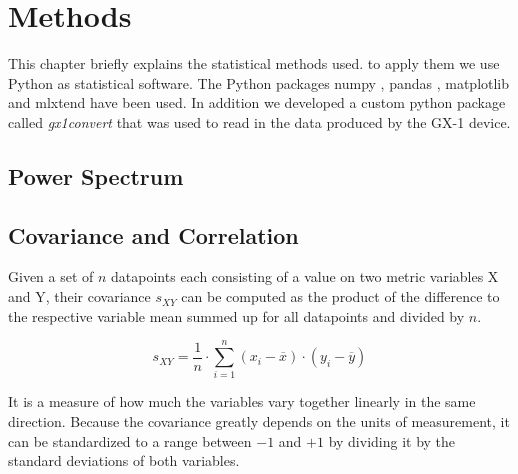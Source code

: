 \documentclass[12 pt]{scrartcl}
\begin{document}




\section{Methods}

This chapter briefly explains the statistical methods used. to apply them we use Python \citep{python} as statistical software. The Python packages numpy \citep{numpy}, pandas \citep{pandas}, matplotlib \citep{matplotlib} and mlxtend \citep{mlxtend} have been used. In addition we developed a custom python package called \emph{gx1convert} \citep{gx1convert} that was used to read in the data produced by the GX-1 device.


\subsection{Power Spectrum}



\subsection{Covariance and Correlation}

Given a set of $n$ datapoints each consisting of a value on two metric variables X and Y, their covariance $s_{XY}$ can be computed as the product of the difference to the respective variable mean summed up for all datapoints and divided by $n$.

\[ s_{XY} = \frac{1}{n} \cdot  \sum_{i=1}^{n}{(x_i - \overline{x}) \cdot (y_i - \overline{y})}\]

It is a measure of how much the variables vary together linearly in the same direction.
Because the covariance greatly depends on the units of measurement, it can be standardized to a range between $-1$ and $+1$ by dividing it by the standard deviations of both variables.
\end{document}
